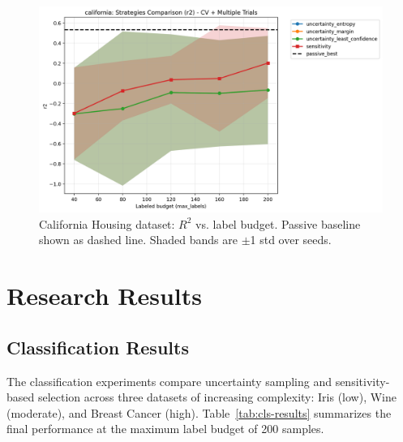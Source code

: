 \documentclass[conference]{IEEEtran}
\begin{document}
\begin{figure}[t]
\centering
\includegraphics[width=0.95\columnwidth]{figures/reg_california_comparison_r2.png}
\caption{California Housing dataset: $R^2$ vs. label budget. Passive baseline shown as dashed line. Shaded bands are $\pm$1 std over seeds.}
\label{fig:california-r2-compare}
\end{figure}

\section{Research Results}

\subsection{Classification Results}

The classification experiments compare uncertainty sampling and sensitivity-based selection across three datasets of increasing complexity: Iris (low), Wine (moderate), and Breast Cancer (high). Table~\ref{tab:cls-results} summarizes the final performance at the maximum label budget of 200 samples.
\end{document}
